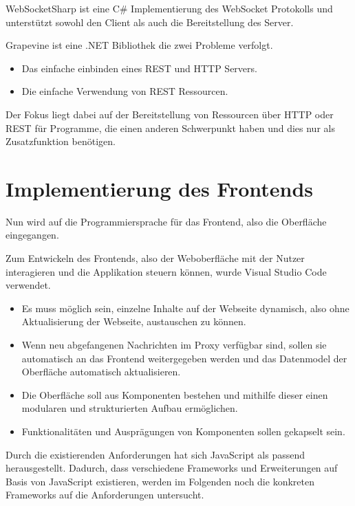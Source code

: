     WebSocketSharp ist eine C\# Implementierung des WebSocket Protokolls und unterstützt sowohl den Client als auch die Bereitstellung des Server.
    
    Grapevine ist eine .NET Bibliothek die zwei Probleme verfolgt.
    \begin{itemize}
        \item Das einfache einbinden eines REST und HTTP Servers.
        \item Die einfache Verwendung von REST Ressourcen.
    \end{itemize}
    Der Fokus liegt dabei auf der Bereitstellung von Ressourcen über HTTP oder REST für Programme, die einen anderen Schwerpunkt haben und dies nur als Zusatzfunktion benötigen.
    
\section{Implementierung des Frontends}
    
    Nun wird auf die Programmiersprache für das Frontend, also die Oberfläche eingegangen.
    
    Zum Entwickeln des Frontends, also der Weboberfläche mit der Nutzer interagieren und die Applikation steuern können, wurde Visual Studio Code \cite{microsoft_2016} verwendet.
    
    \begin{itemize}
        \item Es muss möglich sein, einzelne Inhalte auf der Webseite dynamisch, also ohne Aktualisierung der Webseite, austauschen zu können.
        \item Wenn neu abgefangenen Nachrichten im Proxy verfügbar sind, sollen sie automatisch an das Frontend weitergegeben werden und das Datenmodel der Oberfläche automatisch aktualisieren.
        \item Die Oberfläche soll aus Komponenten bestehen und mithilfe dieser einen modularen und strukturierten Aufbau ermöglichen.
        \item Funktionalitäten und Ausprägungen von Komponenten sollen gekapselt sein.
    \end{itemize}
    
    Durch die existierenden Anforderungen hat sich JavaScript als passend herausgestellt. Dadurch, dass verschiedene Frameworks und Erweiterungen auf Basis von JavaScript existieren, werden im Folgenden noch die konkreten Frameworks auf die Anforderungen untersucht.
    
